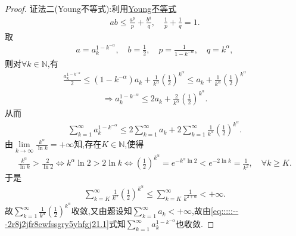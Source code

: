 \documentclass[../../main.tex]{subfiles}%
\begin{document}
\begin{proof}
{\color{blue}证法二(Young不等式):}利用\hyperref[theorem:Young不等式初等形式]{Young不等式}
\begin{align*}
ab\leqslant \frac{a^p}{p}+\frac{b^q}{q},\quad \frac{1}{p}+\frac{1}{q}=1.
\end{align*}
取
\begin{align*}
a=a_{k}^{1-k^{-\alpha}},\quad b=\frac{1}{2},\quad p=\frac{1}{1-k^{-\alpha}},\quad q=k^{\alpha},
\end{align*}
则对$\forall k\in \mathbb{N}$,有
\begin{align*}
\frac{a_{k}^{1-k^{-\alpha}}}{2}\leqslant \left( 1-k^{-\alpha} \right) a_k+\frac{1}{k^{\alpha}}\left( \frac{1}{2} \right) ^{k^{\alpha}}\leqslant a_k+\frac{1}{k^{\alpha}}\left( \frac{1}{2} \right) ^{k^{\alpha}}
\end{align*}
\begin{align*}
\Longrightarrow a_{k}^{1-k^{-\alpha}}\leqslant 2a_k+\frac{2}{k^{\alpha}}\left( \frac{1}{2} \right) ^{k^{\alpha}}.
\end{align*}
从而
\begin{align}
\sum\limits_{k=1}^{\infty}{a_{k}^{1-k^{-\alpha}}}\leqslant 2\sum\limits_{k=1}^{\infty}{a_k}+2\sum\limits_{k=1}^{\infty}{\frac{1}{k^{\alpha}}\left( \frac{1}{2} \right) ^{k^{\alpha}}}. \label{eq:::::---2r8j2jfr8ewfssgry5yhfgj21.1}
\end{align}
由$\lim\limits_{k\rightarrow \infty}{\frac{k^{\alpha}}{\ln k}}=+\infty$知,存在$K\in \mathbb{N}$,使得
\begin{align*}
\frac{k^{\alpha}}{\ln k}>\frac{2}{\ln 2}\Longleftrightarrow k^{\alpha}\ln 2>2\ln k\Longleftrightarrow \left( \frac{1}{2} \right) ^{k^{\alpha}}=e^{-k^{\alpha}\ln 2}<e^{-2\ln k}=\frac{1}{k^2},\quad \forall k\geqslant K.
\end{align*}
于是
\begin{align*}
\sum\limits_{k=K}^{\infty}{\frac{1}{k^{\alpha}}\left( \frac{1}{2} \right) ^{k^{\alpha}}}\leqslant \sum\limits_{k=K}^{\infty}{\frac{1}{k^{2+\alpha}}}<+\infty.
\end{align*}
故$\sum\limits_{k=1}^{\infty}{\frac{1}{k^{\alpha}}\left( \frac{1}{2} \right) ^{k^{\alpha}}}$收敛,又由题设知$\sum\limits_{k=1}^{\infty}{a_k}<+\infty$,故由\eqref{eq:::::---2r8j2jfr8ewfssgry5yhfgj21.1}式知$\sum\limits_{k=1}^{\infty}{a_{k}^{1-k^{-\alpha}}}$也收敛.
\end{proof}
\end{document}
